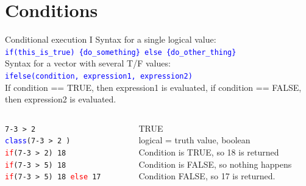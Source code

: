 \documentclass[xcolor=table,      handout ,    xcolor=dvipsnames]{beamer}\usepackage[]{graphicx}\usepackage[]{color}
\newcommand{\rcode}[1]{\texttt{\textcolor{Blue}{#1}}}
\begin{document}
\iffalse %
\section{Conditions}

\begin{frame}[fragile]{Conditional execution I}
Syntax for a single logical value:\\
\rcode{\alert{if}(this\_is\_true) \{do\_something\} \alert{else} \{do\_other\_thing\}}\\[\baselineskip]
\pause
Syntax for a vector with several T/F values:\\
\rcode{\alert{ifelse}(condition, expression1, expression2)}\\[\baselineskip]
\pause
If condition == TRUE, then expression1 is evaluated,
if condition == FALSE, then expression2 is evaluated.\\[1em]
\pause
\begin{columns}
\begin{column}{.40\textwidth}
\texttt{7-3 > 2 \\
\textcolor{blue}{class}(7-3 > 2 ) \\
\textcolor{red}{if}(7-3 > 2) 18  \\
\textcolor{red}{if}(7-3 > 5) 18  \\
\textcolor{red}{if}(7-3 > 5) 18 \textcolor{red}{else} 17 }
\end{column}
\begin{column}{.59\textwidth}
\pause TRUE\\
\pause logical = truth value, boolean\\
\pause Condition is TRUE, so 18 is returned\\
\pause Condition is FALSE, so nothing happens\\
\pause Condition FALSE, so 17 is returned.
\end{column}
\end{columns}
\end{frame}
\end{document}
